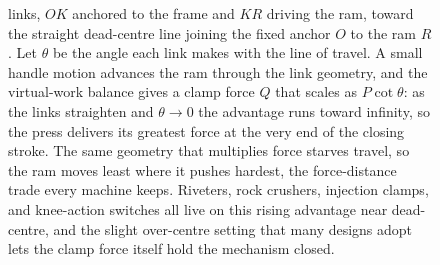 \begin{figure}[htbp]
{links, $OK$ anchored to the frame and $KR$ driving the ram, toward the straight
dead-centre line joining the fixed anchor $O$ to the ram $R$. Let $\theta$ be
the angle each link makes with the line of travel. A small handle motion
advances the ram through the link geometry, and the virtual-work balance gives a
clamp force $Q$ that scales as $P\cot\theta$: as the links straighten and
$\theta\to 0$ the advantage runs toward infinity, so the press delivers its
greatest force at the very end of the closing stroke. The same geometry that
multiplies force starves travel, so the ram moves least where it pushes hardest,
the force-distance trade every machine keeps. Riveters, rock crushers, injection
clamps, and knee-action switches all live on this rising advantage near
dead-centre, and the slight over-centre setting that many designs adopt lets the
clamp force itself hold the mechanism closed.}
\label{fig:vol03ch02:toggle-press}
\end{figure}
